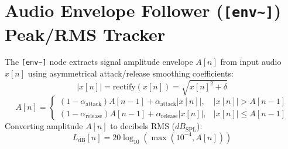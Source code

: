 \documentclass[11pt,a4paper]{article}
\begin{document}
\section{Audio Envelope Follower (\texttt{[env\textasciitilde{}]}) Peak/RMS Tracker}
The \texttt{[env\textasciitilde{}]} node extracts signal amplitude envelope $A[n]$ from input audio $x[n]$ using asymmetrical attack/release smoothing coefficients:
\begin{equation}
|x[n]| = \text{rectify}(x[n]) = \sqrt{x[n]^2 + \delta}
\end{equation}
\begin{equation}
A[n] =
\begin{cases}
(1 - \alpha_{\text{attack}}) A[n-1] + \alpha_{\text{attack}} |x[n]|, & |x[n]| > A[n-1] \\
(1 - \alpha_{\text{release}}) A[n-1] + \alpha_{\text{release}} |x[n]|, & |x[n]| \le A[n-1]
\end{cases}
\end{equation}
Converting amplitude $A[n]$ to decibels RMS ($dB_{\text{SPL}}$):
\begin{equation}
L_{\text{dB}}[n] = 20 \log_{10} \left( \max\left(10^{-4}, A[n]\right) \right)
\end{equation}
\end{document}
